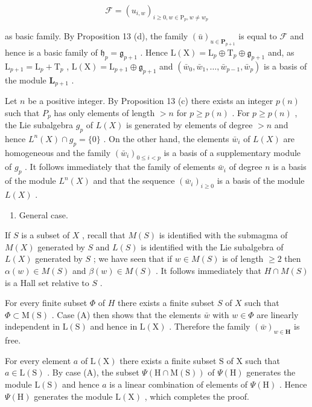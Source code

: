 \[
\mathcal {F} = (u _ {i, w}) _ {i \geqslant 0, w \in \mathrm{P} _ {p}, w \neq w _ {p}}
\]

as basic family. By Proposition 13 (d), the family \((\bar{u})_{u\in \mathbf{P}_{p + 1}}\) is equal to \(\mathcal{F}\) and hence is a basic family of \(\mathfrak{h}_p = \mathfrak{g}_{p + 1}\) . Hence \(\mathrm{L}(\mathrm{X}) = \mathrm{L}_p\oplus \mathrm{T}_p\oplus \mathfrak{g}_{p + 1}\) and, as \(\mathrm{L}_{p + 1} = \mathrm{L}_p + \mathrm{T}_p\) , \(\mathrm{L}(\mathrm{X}) = \mathrm{L}_{p + 1}\oplus \mathfrak{g}_{p + 1}\) and \((\bar{w}_0,\bar{w}_1,\dots ,\bar{w}_{p - 1},\bar{w}_p)\) is a basis of the module \(\mathbf{L}_{p + 1}\) .

Let \(n\) be a positive integer. By Proposition 13 (c) there exists an integer \(p(n)\) such that \(P_p\) has only elements of length \(>n\) for \(p \geqslant p(n)\) . For \(p \geqslant p(n)\) , the Lie subalgebra \(g_p\) of \(L(X)\) is generated by elements of degree \(>n\) and hence \(L^n(X) \cap g_p = \{0\}\) . On the other hand, the elements \(\bar{w}_i\) of \(L(X)\) are homogeneous and the family \((\bar{w}_i)_{0 \leqslant i < p}\) is a basis of a supplementary module of \(g_p\) . It follows immediately that the family of elements \(\bar{w}_i\) of degree \(n\) is a basis of the module \(L^n(X)\) and that the sequence \((\bar{w}_i)_{i \geqslant 0}\) is a basis of the module \(L(X)\) .

\begin{enumerate}
\def\labelenumi{(\Alph{enumi})}
\setcounter{enumi}{1}
\tightlist
\item
  General case.
\end{enumerate}

If \(S\) is a subset of \(X\) , recall that \(M(S)\) is identified with the submagma of \(M(X)\) generated by \(S\) and \(L(S)\) is identified with the Lie subalgebra of \(L(X)\) generated by \(S\) ; we have seen that if \(w \in M(S)\) is of length \(\geqslant 2\) then \(\alpha(w) \in M(S)\) and \(\beta(w) \in M(S)\) . It follows immediately that \(H \cap M(S)\) is a Hall set relative to \(S\) .

For every finite subset \(\Phi\) of \(H\) there exists a finite subset \(S\) of \(X\) such that \(\Phi \subset \mathrm{M}(\mathrm{S})\) . Case (A) then shows that the elements \(\bar{w}\) with \(w \in \Phi\) are linearly independent in \(\mathrm{L}(\mathrm{S})\) and hence in \(\mathrm{L}(\mathrm{X})\) . Therefore the family \((\bar{w})_{w \in \mathbf{H}}\) is free.

For every element \(a\) of \(\mathrm{L}(\mathrm{X})\) there exists a finite subset \(\mathrm{S}\) of \(\mathrm{X}\) such that \(a \in \mathrm{L}(\mathrm{S})\) . By case (A), the subset \(\Psi(\mathrm{H} \cap \mathrm{M}(\mathrm{S}))\) of \(\Psi(\mathrm{H})\) generates the module \(\mathrm{L}(\mathrm{S})\) and hence \(a\) is a linear combination of elements of \(\Psi(\mathrm{H})\) . Hence \(\Psi(\mathrm{H})\) generates the module \(\mathrm{L}(\mathrm{X})\) , which completes the proof.


